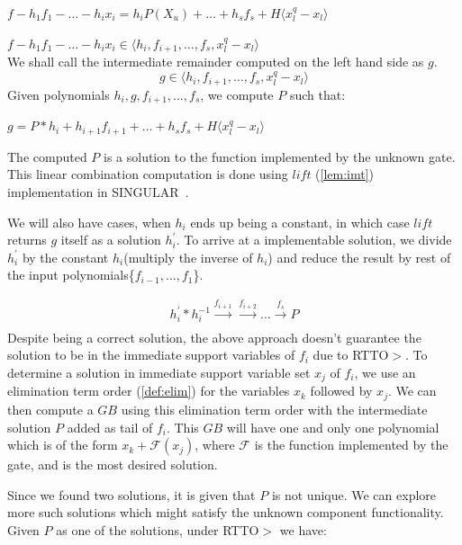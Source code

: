 $f - h_1f_1 -\dots-h_ix_i = h_iP(X_u)+\dots+h_sf_s+H\langle x_l^q-x_l\rangle$

$f - h_1f_1 -\dots-h_ix_i \in \langle h_i,f_{i+1},\dots,f_s, x_l^q-x_l\rangle$\\
We shall call the intermediate remainder computed on the left hand side as $g$.
\begin{equation}
g \in \langle h_i,f_{i+1},\dots,f_s, x_l^q-x_l\rangle
\end{equation}
Given polynomials $h_i, g, f_{i+1},\dots,f_s$, we compute $P$ such that:

 $g = P*h_i+h_{i+1}f_{i+1}+\dots+h_sf_s+H\langle x_l^q-x_l\rangle$

The computed $P$ is a solution to the function implemented by the unknown gate. This linear combination computation is done using $lift$ (\autoref{lem:imt}) implementation in SINGULAR~\cite{DGPS_410}.

We will also have cases, when $h_i$ ends up being a constant, in which case $lift$ returns $g$ itself as a solution $h_i^{'}$. To arrive at a implementable solution, we divide $h_i^{'}$ by the constant $h_i$(multiply the inverse of $h_i$) and reduce the result by rest of the input polynomials\{$f_{i-1},\dots,f_1$\}. 

\begin{align}
h_i^{'}*h_i^{-1}\xrightarrow[]{f_{i+1}}\xrightarrow[]{f_{i+2}}\dots\xrightarrow[]{f_s}P
\end{align}
Despite being a correct solution, the above approach doesn't guarantee the solution to be in the immediate support variables of $f_i$ due to RTTO$>$. To determine a solution in immediate support variable set $x_j$ of $f_i$, we use an elimination term order (\autoref{def:elim}) for the variables $x_k$ followed by $x_j$. We can then compute a $GB$ using this elimination term order with the intermediate solution $P$ added as tail of $f_i$. This $GB$ will have one and only one polynomial which is of the form $x_k + \mathcal{F}(x_j)$, where $\mathcal{F}$ is the function implemented by the gate, and is the most desired solution. 

Since we found two solutions, it is given that $P$ is not unique. We can explore more such solutions which might satisfy the unknown component functionality. Given $P$ as one of the solutions, under RTTO$>$ we have:


